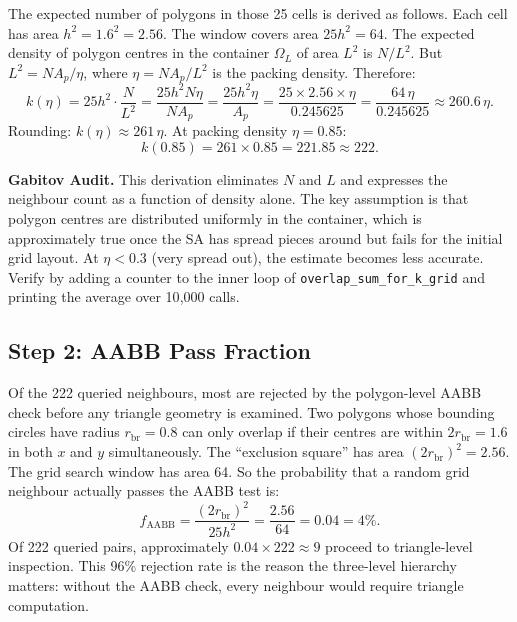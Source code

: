 \documentclass[11pt,oneside]{article}
\newcommand{\gabitov}[1]{\begin{gabitovbox}\textbf{Gabitov Audit.} #1\end{gabitovbox}}
\begin{document}
The expected number of polygons in those 25 cells is derived as
follows. Each cell has area $h^2 = 1.6^2 = 2.56$. The window covers
area $25 h^2 = 64$. The expected density of polygon centres in the
container $\Omega_L$ of area $L^2$ is $N / L^2$. But $L^2 = N A_p /
\eta$, where $\eta = N A_p / L^2$ is the packing density. Therefore:
\begin{equation}
  k(\eta)
  = 25 h^2 \cdot \frac{N}{L^2}
  = \frac{25 h^2 N \eta}{N A_p}
  = \frac{25 h^2 \eta}{A_p}
  = \frac{25 \times 2.56 \times \eta}{0.245625}
  = \frac{64\,\eta}{0.245625}
  \approx 260.6\,\eta.
  \label{eq:keta}
\end{equation}
Rounding: $k(\eta) \approx 261\,\eta$. At packing density $\eta =
0.85$:
\[
  k(0.85) = 261 \times 0.85 = 221.85 \approx 222.
\]

\gabitov{%
This derivation eliminates $N$ and $L$ and expresses the neighbour
count as a function of density alone. The key assumption is that polygon
centres are distributed uniformly in the container, which is
approximately true once the SA has spread pieces around but fails for
the initial grid layout. At $\eta < 0.3$ (very spread out), the
estimate becomes less accurate. Verify by adding a counter to the
inner loop of \texttt{overlap\_sum\_for\_k\_grid} and printing the
average over 10{,}000 calls.%
}

\subsection{Step 2: AABB Pass Fraction}

Of the 222 queried neighbours, most are rejected by the polygon-level
AABB check before any triangle geometry is examined. Two polygons whose
bounding circles have radius $r_{\mathrm{br}} = 0.8$ can only overlap
if their centres are within $2 r_{\mathrm{br}} = 1.6$ in both $x$ and
$y$ simultaneously. The ``exclusion square'' has area $(2
r_{\mathrm{br}})^2 = 2.56$. The grid search window has area 64. So the
probability that a random grid neighbour actually passes the AABB test
is:
\begin{equation}
  f_{\mathrm{AABB}} = \frac{(2 r_{\mathrm{br}})^2}{25 h^2}
  = \frac{2.56}{64} = 0.04 = 4\%.
  \label{eq:faabb}
\end{equation}
Of 222 queried pairs, approximately $0.04 \times 222 \approx 9$ proceed
to triangle-level inspection. This 96\% rejection rate is the reason the
three-level hierarchy matters: without the AABB check, every neighbour
would require triangle computation.
\end{document}
